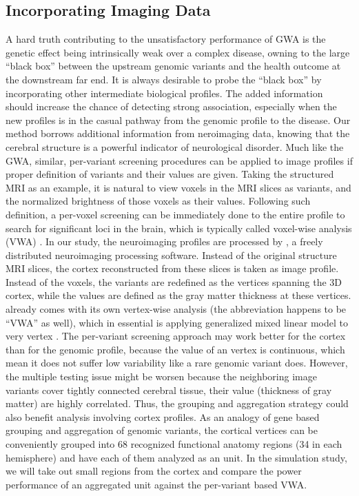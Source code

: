 \subsection{Incorporating Imaging Data}
A hard truth contributing to the unsatisfactory performance of GWA is the genetic effect being intrinsically weak over a complex disease, owning to the large ``black box'' between the upstream genomic variants and the health outcome at the downstream far end. It is always desirable to probe the ``black box'' by incorporating other intermediate biological profiles. The added information should increase the chance of detecting strong association, especially when the new profiles is in the casual pathway from the genomic profile to the disease. Our method borrows additional information from neroimaging data, knowing that the cerebral structure is a powerful indicator of neurological disorder. Much like the GWA, similar, per-variant screening procedures can be applied to image profiles if proper definition of variants and their values are given. Taking the structured MRI as an example, it is natural to view voxels in the MRI slices as variants, and the normalized brightness of those voxels as their values. Following such definition, a per-voxel screening can be immediately done to the entire profile to search for significant loci in the brain, which is typically called voxel-wise analysis (VWA) \cite{VWA1, VWA2, VWA3, VWA4}. In our study, the neuroimaging profiles are processed by \FS, a freely distributed neuroimaging processing software. Instead of the original structure MRI slices, the cortex reconstructed from these slices is taken as image profile. Instead of the voxels, the variants are redefined as the vertices spanning the 3D cortex, while the values are defined as the gray matter thickness at these vertices. \FS already comes with its own vertex-wise analysis (the abbreviation happens to be ``VWA'' as well), which in essential is applying generalized mixed linear model to very vertex \cite{FS:Anl1, FS:Anl2}. The per-variant screening approach may work better for the cortex than for the genomic profile, because the value of an vertex is continuous, which mean it does not suffer low variability like a rare genomic variant does. However, the multiple testing issue might be worsen because the neighboring image variants cover tightly connected cerebral tissue, their value (thickness of gray matter) are highly correlated. Thus, the grouping and aggregation strategy could also benefit analysis involving cortex profiles. As an analogy of gene based grouping and aggregation of genomic variants, the cortical vertices can be conveniently grouped into 68 recognized functional anatomy regions (34 in each hemisphere) and have each of them analyzed as an unit. In the simulation study, we will take out small regions from the cortex and compare the power performance of an aggregated unit against the per-variant based VWA.

